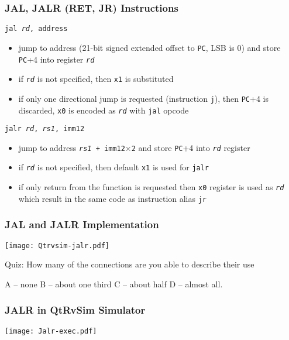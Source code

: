 \documentclass{beamer}
\begin{document}
\begin{frame}
\frametitle{JAL, JALR (RET, JR) Instructions}

\texttt{jal \textit{rd}, address}
\begin{itemize}
 \item jump to address (21-bit signed extended offset to \texttt{PC}, LSB is 0) and store \texttt{PC}+4 into register \texttt{\textit{rd}} 
 \item if \texttt{\textit{rd}} is not specified, then \texttt{x1} is substituted
 \item if only one directional jump is requested (instruction \texttt{j}), then \texttt{PC}+4 is discarded, \texttt{x0} is encoded as \texttt{\textit{rd}} with \texttt{jal} opcode
\end{itemize}

\texttt{jalr \textit{rd}, \textit{rs1}, imm12}
\begin{itemize}
 \item jump to address \texttt{\textit{rs1} + imm12$\times$2} and store \texttt{PC}+4 into \texttt{\textit{rd}} register 
 \item if \texttt{\textit{rd}} is not specified, then default \texttt{x1} is used for \texttt{jalr}
 \item if only return from the function is requested then \texttt{x0} register is used as \texttt{\textit{rd}} which result in the same code as instruction alias \texttt{jr}
\end{itemize}
\end{frame}


\begin{frame}
\frametitle{JAL and JALR Implementation}

\begin{center}
\texttt{[image: Qtrvsim-jalr.pdf]}
\end{center}

Quiz: How many of the connections are you able to describe their use

\phantom{Quiz: }A -- none B -- about one third  C -- about half D -- almost all.
\end{frame}


\begin{frame}
\frametitle{JALR in QtRvSim Simulator}

\begin{center}
\texttt{[image: Jalr-exec.pdf]}
\end{center}

\end{frame}
\end{document}
